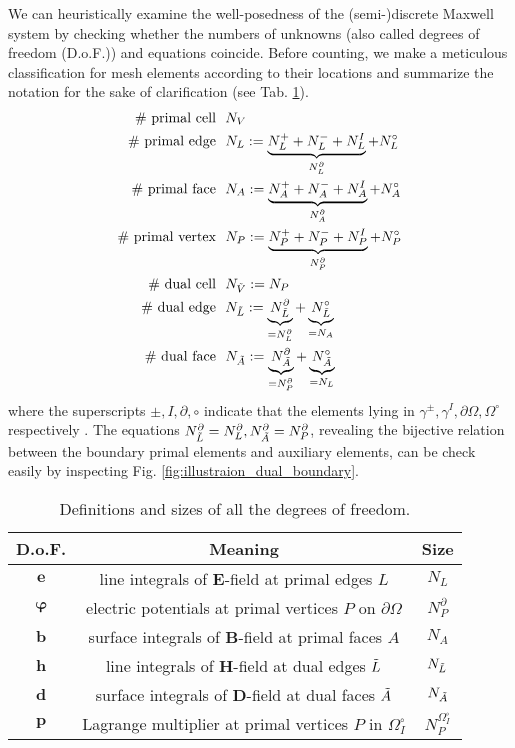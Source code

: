 \documentclass{article}
\begin{document}
We can heuristically examine the well-posedness of the (semi-)discrete Maxwell system by checking whether the numbers of unknowns (also called degrees of freedom (D.o.F.)) and equations coincide. Before counting, we make a meticulous classification for mesh elements according to their locations and summarize the notation for the sake of clarification (see Tab. \ref{tab:def_size_var}). 
\begin{align*}
    \#\  \text{primal cell}\ \  &N_V \\
    \#\  \text{primal edge}\ \  &N_L := \underbrace{N^+_L + N^-_L + N^I_L}_{N^\partial_L} + N^\circ_L  \\
    \#\  \text{primal face}\ \  &N_A := \underbrace{N_A^+ + N_A^- + N^I_A}_{N^\partial_A} + N^\circ_A  \\
    \#\  \text{primal vertex}\ \  &N_P := \underbrace{N_P^+ + N_P^- + N^I_P}_{N^\partial_P} + N^\circ_P \\
    \#\  \text{dual cell}\ \  &N_{\Tilde{V}} := N_P \\
    \#\  \text{dual edge}\ \  &N_{\Tilde{L}} := \underbrace{N^\partial_{\Tilde{L}}}_{=N^\partial_L} + \underbrace{N^\circ_{\Tilde{L}}}_{=N_A} \\
    \#\  \text{dual face}\ \  &N_{\Tilde{A}} := \underbrace{N^\partial_{\Tilde{A}}}_{=N^\partial_P} + \underbrace{N^\circ_{\Tilde{A}}}_{=N_L}
\end{align*}
where the superscripts $\pm, I, \partial, \circ$ indicate that the elements lying in $\gamma^\pm, \gamma^I, \partial\Omega, \Omega^\circ$ respectively . The equations $N^\partial_{\Tilde{L}} = N^\partial_L, N^\partial_{\Tilde{A}} = N^\partial_P$, revealing the bijective relation between the boundary primal elements and auxiliary elements, can be check easily by inspecting Fig. \ref{fig:illustraion_dual_boundary}.

\begin{table}[]
    \centering
\begin{tabular}{c c c}
     \hline
     \textbf{D.o.F.}  & \textbf{Meaning}  & \textbf{Size} \\
     \hline\hline
     $\mathbf{e}$ & line integrals of $\mathbf{E}$-field at primal edges $L$& $N_L$ \\
     $\bm{\varphi}$ & electric potentials at primal vertices $P$ on $\partial\Omega$ & $N_P^\partial$ \\
     $\mathbf{b}$ & surface integrals of $\mathbf{B}$-field at primal faces $A$ & $N_A$ \\
     $\mathbf{h}$ & line integrals of $\mathbf{H}$-field at dual edges $\Tilde{L}$ & $N_{\Tilde{L}}$ \\
     $\mathbf{d}$ & surface integrals of $\mathbf{D}$-field at dual faces $\Tilde{A}$ & $N_{\Tilde{A}}$ \\
     $\mathbf{p}$ & Lagrange multiplier at primal vertices $P$ in $\Omega_I^\circ$ & $N^{\Omega_I^\circ}_P$\\ 
     \hline
\end{tabular}
    \caption{Definitions and sizes of all the degrees of freedom.}
    \label{tab:def_size_var}
\end{table}
\end{document}
